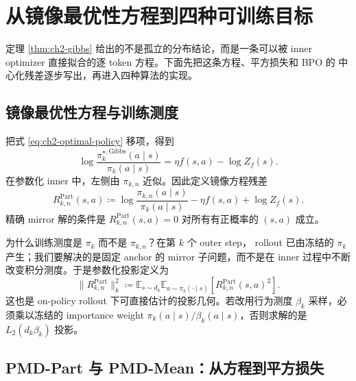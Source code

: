 \section{从镜像最优性方程到四种可训练目标}
\label{sec:ch2-objective-derivation}

定理 \ref{thm:ch2-gibbs} 给出的不是孤立的分布结论，而是一条可以被 inner
optimizer 直接拟合的逐 token 方程。下面先把这条方程、平方损失和 BPO 的
中心化残差逐步写出，再进入四种算法的实现。

\subsection{镜像最优性方程与训练测度}
\label{subsec:ch2-optimality-bridge}

把式 \eqref{eq:ch2-optimal-policy} 移项，得到
\begin{equation}
\label{eq:ch2-logratio-equation}
\log\frac{\pi_k^{\star,\mathrm{Gibbs}}(a\mid s)}{\pi_k(a\mid s)}
=\eta f(s,a)-\log Z_f(s).
\end{equation}
在参数化 inner 中，左侧由 $\pi_{k,n}$ 近似。因此定义镜像方程残差
\begin{equation}
R_{k,n}^{\mathrm{Part}}(s,a)
\coloneqq
\log\frac{\pi_{k,n}(a\mid s)}{\pi_k(a\mid s)}
-\eta f(s,a)+\log Z_f(s).
\label{eq:ch2-mirror-equation-residual}
\end{equation}
精确 mirror 解的条件是 $R_{k,n}^{\mathrm{Part}}(s,a)=0$ 对所有有正概率的
$(s,a)$ 成立。

为什么训练测度是 $\pi_k$ 而不是 $\pi_{k,n}$？在第 $k$ 个 outer step，
rollout 已由冻结的 $\pi_k$ 产生；我们要解决的是固定 anchor 的 mirror
子问题，而不是在 inner 过程中不断改变积分测度。于是参数化投影定义为
\begin{equation}
\lVert R_{k,n}^{\mathrm{Part}}\rVert_k^2
\coloneqq
\mathbb E_{s\sim d_k}\mathbb E_{a\sim\pi_k(\cdot\mid s)}
\left[R_{k,n}^{\mathrm{Part}}(s,a)^2\right].
\label{eq:ch2-anchor-projection-norm}
\end{equation}
这也是 on-policy rollout 下可直接估计的投影几何。若改用行为测度 $\beta_k$
采样，必须乘以冻结的 importance weight
$\pi_k(a\mid s)/\beta_k(a\mid s)$，否则求解的是 $L_2(d_k\beta_k)$ 投影。

\subsection{PMD-Part 与 PMD-Mean：从方程到平方损失}
\label{subsec:ch2-pmd-loss-derivation}

